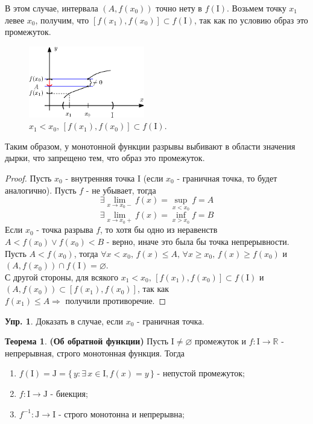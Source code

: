 \documentclass[12pt]{article}
\newcommand{\MR}{\mathbb{R}}
\newcommand{\MI}{\mathrm{I}}
\newcommand{\MJ}{\mathrm{J}}
\newcommand{\VN}{\varnothing}
\theoremstyle{definition}
\newtheorem{exrc}{Упр.}
\newtheorem{theorem}{Теорема}
\begin{document}
В этом случае, интервала $(A,f(x_0))$ точно нету в $f(\MI)$. Возьмем точку $x_1$ левее $x_0$, получим, что $[f(x_1),f(x_0)] \subset f(\MI)$, так как по условию образ это промежуток.

\begin{figure}[H]
	\centering
	\includegraphics[width=0.45\textwidth]{19_3.eps}
	\caption{$x_1 < x_0,\,[f(x_1),f(x_0)] \subset f(\MI)$.}
	\label{19_3}
\end{figure}

Таким образом, у монотонной функции разрывы выбивают в области значения дырки, что запрещено тем, что образ это промежуток.
 
\begin{proof}
	Пусть $x_0$ - внутренняя точка $\MI$ (если $x_0$ - граничная точка, то будет аналогично). Пусть $f$ - не убывает, тогда 
	$$\exists \! \lim\limits_{x \to x_0-}f(x) = \sup\limits_{x < x_0}{f} = A$$
	$$\exists \! \lim\limits_{x \to x_0+}f(x) = \inf\limits_{x > x_0}{f} = B$$
	Если $x_0$ - точка разрыва $f$, то хотя бы одно из неравенств $A < f(x_0) \vee f(x_0) < B$ - верно, иначе это была бы точка непрерывности. Пусть $A < f(x_0)$, тогда $\forall x < x_0, \, f(x) \leq A, \, \forall x \geq x_0, \, f(x) \geq f(x_0)$ и $(A, f(x_0)) \cap f(\MI) = \VN$. \\
	С другой стороны, для всякого $x_1 < x_0, \, [f(x_1), f(x_0)] \subset f(\MI)$ и $(A, f(x_0)) \subset [f(x_1),f(x_0)]$, так как \\ $f(x_1) \leq A \Rightarrow$ получили противоречие.	
\end{proof}

\begin{exrc}
	Доказать в случае, если $x_0$ - граничная точка.
\end{exrc}

\begin{theorem}\textbf{(Об обратной функции)}
	Пусть $\MI \neq \VN$ промежуток и $f \colon \MI \to \MR$ - непрерывная, строго монотонная функция. Тогда 
	\begin{enumerate}[label={\arabic*)}]
		\item $f(\MI) = \MJ = \{\, y \colon \exists \, x \in \MI, f(x) = y \,\}$ - непустой промежуток;
		\item $f\colon \MI \to \MJ$ - биекция;
		\item $f^{-1} \colon \MJ \to \MI$ - строго монотонна и непрерывна;
	\end{enumerate}
\end{theorem}
\end{document}
